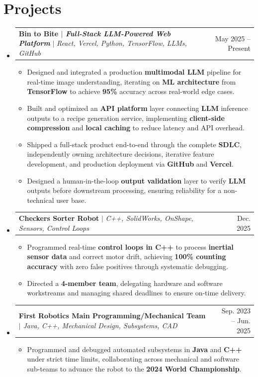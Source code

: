 \documentclass[letterpaper,11pt]{article}
\makeatletter
\newcommand{\resumeItem}[1]{
  \item\small{{#1\vspace{-2pt}}}
}
\newcommand{\resumeProjectHeading}[3]{
  \vspace{-2pt}\item
  \begin{tabular*}{0.97\textwidth}[t]{l@{\extracolsep{\fill}}r}
    \textbf{#1} $|$ \textit{\small#2} & #3 \\
  \end{tabular*}\vspace{-7pt}
}
\newcommand{\resumeSubHeadingListStart}{\begin{itemize}[leftmargin=0.15in, label={}]}
\newcommand{\resumeSubHeadingListEnd}{\end{itemize}}
\newcommand{\resumeItemListStart}{\begin{itemize}}
\newcommand{\resumeItemListEnd}{\end{itemize}\vspace{-5pt}}
\makeatother
\begin{document}
\section{Projects}
    \resumeSubHeadingListStart
        \resumeProjectHeading
            {Bin to Bite $|$ \emph{Full-Stack LLM-Powered Web Platform}}
            {React, Vercel, Python, TensorFlow, LLMs, GitHub}
            {May 2025 -- Present}
        \resumeItemListStart
            \resumeItem{Designed and integrated a production \textbf{multimodal LLM} pipeline for real-time image understanding, iterating on \textbf{ML architecture} from \textbf{TensorFlow} to achieve \textbf{95\%} accuracy across real-world edge cases.}
            \resumeItem{Built and optimized an \textbf{API platform} layer connecting \textbf{LLM} inference outputs to a recipe generation service, implementing \textbf{client-side compression} and \textbf{local caching} to reduce latency and API overhead.}
            \resumeItem{Shipped a full-stack product end-to-end through the complete \textbf{SDLC}, independently owning architecture decisions, iterative feature development, and production deployment via \textbf{GitHub} and \textbf{Vercel}.}
            \resumeItem{Designed a human-in-the-loop \textbf{output validation} layer to verify \textbf{LLM} outputs before downstream processing, ensuring reliability for a non-technical user base.}
        \resumeItemListEnd
        \resumeProjectHeading
            {Checkers Sorter Robot}
            {C++, SolidWorks, OnShape, Sensors, Control Loops}
            {Dec. 2025}
        \resumeItemListStart
            \resumeItem{Programmed real-time \textbf{control loops in C++} to process \textbf{inertial sensor data} and correct motor drift, achieving \textbf{100\% counting accuracy} with zero false positives through systematic debugging.}
            \resumeItem{Directed a \textbf{4-member team}, delegating hardware and software workstreams and managing shared deadlines to ensure on-time delivery.}
        \resumeItemListEnd
        \resumeProjectHeading
            {First Robotics Main Programming/Mechanical Team}
            {Java, C++, Mechanical Design, Subsystems, CAD}
            {Sep. 2023 -- Jun. 2025}
        \resumeItemListStart
            \resumeItem{Programmed and debugged automated subsystems in \textbf{Java} and \textbf{C++} under strict time limits, collaborating across mechanical and software sub-teams to advance the robot to the \textbf{2024 World Championship}.}
        \resumeItemListEnd
    \resumeSubHeadingListEnd
\end{document}
